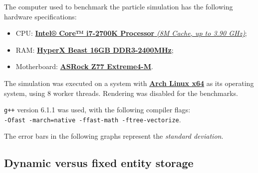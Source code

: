 \documentclass[twoside, 12pt, a4paper, openany]{book}
\begin{document}
The computer used to benchmark the particle simulation has the following
hardware specifications:

\begin{itemize}
\item
  CPU:
  \href{http://ark.intel.com/products/61275/Intel-Core-i7-2700K-Processor-8M-Cache-up-to-3_90-GHz}{\textbf{Intel®
  Core™ i7-2700K Processor} \emph{(8M Cache, up to 3.90 GHz)}};
\item
  RAM: \href{http://www.hyperxgaming.com/us/memory/beast}{\textbf{HyperX
  Beast 16GB DDR3-2400MHz}};
\item
  Motherboard:
  \href{http://www.asrock.com/mb/intel/z77\%20extreme4-m/}{\textbf{ASRock
  Z77 Extreme4-M}}.
\end{itemize}

The simulation was executed on a system with
\href{https://www.archlinux.org/}{\textbf{Arch Linux x64}} as its
operating system, using \(8\) worker threads. Rendering was disabled for
the benchmarks.

\texttt{g++}
version 6.1.1 was used, with the following compiler flags:\\
\texttt{-Ofast -march=native -ffast-math -ftree-vectorize}.

The error bars in the following graphs represent the \emph{standard
deviation}.

\subsection{Dynamic versus fixed entity
storage}\label{dynamic-versus-fixed-entity-storage}
\end{document}
